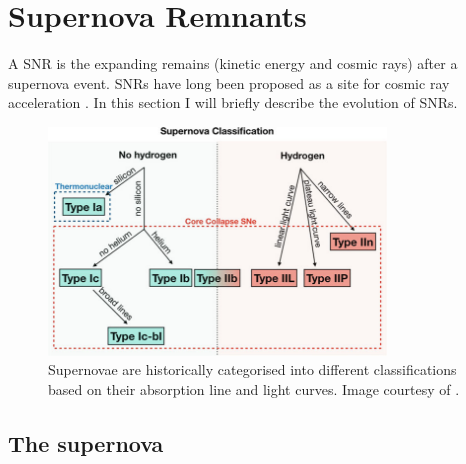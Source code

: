 \chapter{Supernova Remnants} \label{appendix:snrs}

A SNR is the expanding remains (kinetic energy and cosmic rays) after a supernova event. SNRs have long been proposed as a site for cosmic ray acceleration \citep{1934CoMtW...3...73B}. In this section I will briefly describe the evolution of SNRs.

\begin{figure}
    \centering
    \includegraphics[width=0.8\textwidth]{A1_Supernova_Remnants/Images/supernova_classification.pdf}
    \caption{Supernovae are historically categorised into different classifications based on their absorption line and light curves. Image courtesy of \cite{alma9928040781501811}.}
    \label{fig:A1_supernova_classification}
\end{figure}


\section{The supernova}

